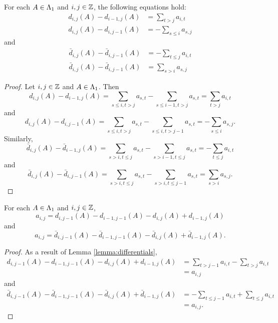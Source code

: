 \documentclass[a4paper, 11pt]{report}
\begin{document}
\begin{lemma}\label{lemma:differentials}
For each $A\in\Lambda_1{}$ and $i,j\in\mathbb{Z}$, the following equations hold:
\begin{align*}
d_{i,j}{(A)} - d_{i-1,j}{(A)} &= \sum_{t>j}a_{i,t}\\
d_{i,j}{(A)}-d_{i,j-1}{(A)} &= - \sum_{s\le i}a_{s,j}
\end{align*}
and
\begin{align*}
\bar{d}_{i,j}{(A)} - \bar{d}_{i,j-1}{(A)} &= -\sum_{t\le j} a_{i,t}\\
\bar{d}_{i,j}{(A)} - \bar{d}_{i,j-1}{(A)} &= \sum_{s>i} a_{s,j}
\end{align*}
\end{lemma}

\begin{proof}
Let $i,j\in\mathbb{Z}$ and $A\in\Lambda_1{}$. Then
\begin{equation*}
d_{i,j}{(A)} - d_{i-1,j}{(A)} = \sum_{s\le i,t>j}a_{s,t} - \sum_{s\le i-1,t>j}a_{s,t} = \sum_{t>j}a_{i,t}
\end{equation*}
and
\begin{equation*}
d_{i,j}{(A)}-d_{i,j-1}{(A)} = \sum_{s\le i,t>j}a_{s,t} - \sum_{s\le i,t>j-1}a_{s,t} = -\sum_{s\le i}a_{s,j}.
\end{equation*}
Similarly,
\begin{equation*}
\bar{d}_{i,j}{(A)} - \bar{d}_{i-1,j}{(A)} = \sum_{s>i,t\le j} a_{s,t} - \sum_{s>i-1,t\le j} a_{s,t} = -\sum_{t\le j} a_{i,t}
\end{equation*}
and
\begin{equation*}
\bar{d}_{i,j}{(A)} - \bar{d}_{i,j-1}{(A)} = \sum_{s>i,t\le j} a_{s,t} - \sum_{s>i,t\le j-1} a_{s,t} = \sum_{s>i} a_{s,j}.
\end{equation*}
\end{proof}

\begin{lemma}\label{lemma:antisymmetry}
For each $A\in\Lambda_1{}$ and $i,j\in\mathbb{Z}$,
\begin{equation*}
a_{i,j} = d_{i,j-1}{(A)} - d_{i-1,j-1}{(A)} - d_{i,j}{(A)} + d_{i-1,j}{(A)}
\end{equation*}
and
\begin{equation*}
a_{i,j} = \bar{d}_{i,j-1}{(A)} - \bar{d}_{i-1,j-1}{(A)} - \bar{d}_{i,j}{(A)} + \bar{d}_{i-1,j}{(A)}.
\end{equation*}
\end{lemma}

\begin{proof}
As a result of Lemma \ref{lemma:differentials},
\begin{align*}
d_{i,j-1}{(A)} - d_{i-1,j-1}{(A)} - d_{i,j}{(A)} + d_{i-1,j}{(A)} &= \sum_{t>j-1} a_{i,t} - \sum_{t>j} a_{i,t}\\
&= a_{i,j}
\end{align*}
and
\begin{align*}
\bar{d}_{i,j-1}{(A)} - \bar{d}_{i-1,j-1}{(A)} - \bar{d}_{i,j}{(A)} + \bar{d}_{i-1,j}{(A)} &= -\sum_{t\le j-1} a_{i,t} + \sum_{t\le j} a_{i,t}\\
&= a_{i,j}.
\end{align*}
\end{proof}
\end{document}
